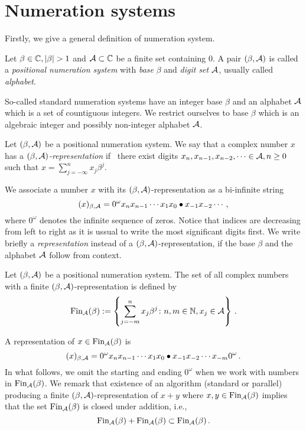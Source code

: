 \section{Numeration systems}
Firstly, we give a general definition of numeration system.
\begin{defn}
  Let $\beta \in \CC, |\beta|>1$ and $\mathcal{A} \subset \mathbb{C}$ be a finite set containing 0. A pair $(\beta, \mathcal{A})$ is called a \emph{positional numeration system} with \emph{base} $\beta$ and \emph{digit set} $\mathcal{A}$, usually called \emph{alphabet}.
\end{defn}
So-called standard numeration systems have an integer base $\beta$ and an alphabet $\mathcal{A}$ which is a set of countiguous integers. We restrict ourselves to base $\beta$ which is an algebraic integer and possibly non-integer alphabet $\mathcal{A}$. 
\begin{defn}
Let $(\beta, \mathcal{A})$ be a positional numeration system.  We say that a complex number $x$ has a \emph{$(\beta, \mathcal{A})$-representation} if~ there exist digits $x_n,x_{n-1}, x_{n-2},\dots \in\mathcal{A}, n\geq 0$ such that $x=\sum_{j=-\infty}^n x_j \beta^j$.
\end{defn}
We associate a number $x$ with its  $(\beta, \mathcal{A})$-representation as a bi-infinite string 
  $$
    (x)_{\beta,\mathcal{A}}=0^\omega x_n x_{n-1}\cdots x_1 x_0 \bullet x_{-1} x_{-2} \cdots\,,
  $$
  where $0^\omega$ denotes the infinite sequence of zeros. Notice that indices are decreasing from left to right as it is ussual to write the most significant digits first. We write briefly a \emph{representation} instead of a $(\beta, \mathcal{A})$-representation, if the base $\beta$ and the alphabet $\mathcal{A}$ follow from context. 

\begin{defn}
Let $(\beta, \mathcal{A})$ be a positional numeration system. The set of all complex numbers with a finite $(\beta, \mathcal{A})$-representation is defined by
$$
    \text{Fin}_{\mathcal{A}}(\beta):=\left\{\sum_{j=-m}^n x_j \beta^j\colon n, m \in \mathbb{N}, x_j \in \mathcal{A} \right\}\,.
$$
\end{defn}
   
A representation of $x\in\text{Fin}_{\mathcal{A}}(\beta)$ is 
$$
(x)_{\beta,\mathcal{A}}= 0^\omega x_n x_{n-1}\cdots x_1 x_0 \bullet x_{-1} x_{-2} \cdots x_{-m} 0^\omega\,.
$$ 
In what follows, we omit the starting and ending $0^\omega$ when we work with numbers in $\text{Fin}_{\mathcal{A}}(\beta)$. We remark that existence of an algorithm (standard or parallel) producing a finite $(\beta,\mathcal{A})$-representation of $x+y$ where $x,y\in\text{Fin}_{\mathcal{A}}(\beta)$ implies that the set $\text{Fin}_{\mathcal{A}}(\beta)$ is closed under addition, i.e.,
$$
\text{Fin}_{\mathcal{A}}(\beta) + \text{Fin}_{\mathcal{A}}(\beta) \subset \text{Fin}_{\mathcal{A}}(\beta)\,.
$$ 

